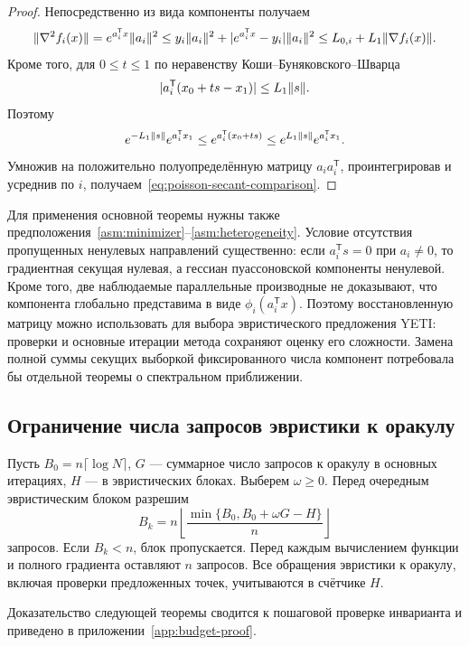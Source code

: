 \begin{proof}
Непосредственно из вида компоненты получаем
\[
 \lVert\nabla^2f_i(x)\rVert
 =e^{a_i^{\mathsf T}x}\lVert a_i\rVert^2
 \le y_i\lVert a_i\rVert^2+|e^{a_i^{\mathsf T}x}-y_i|\lVert a_i\rVert^2
 \le L_{0,i}+L_1\lVert\nabla f_i(x)\rVert.
\]
Кроме того, для $0\le t\le1$ по неравенству Коши--Буняковского--Шварца
\[
 |a_i^{\mathsf T}(x_0+ts-x_1)|\le L_1\lVert s\rVert.
\]
Поэтому
\[
 e^{-L_1\lVert s\rVert}e^{a_i^{\mathsf T}x_1}
 \le e^{a_i^{\mathsf T}(x_0+ts)}
 \le e^{L_1\lVert s\rVert}e^{a_i^{\mathsf T}x_1}.
\]
Умножив на положительно полуопределённую матрицу
$a_i a_i^{\mathsf T}$, проинтегрировав и усреднив по $i$,
получаем~\eqref{eq:poisson-secant-comparison}.
\end{proof}

Для применения основной теоремы нужны также
предположения~\ref{asm:minimizer}--\ref{asm:heterogeneity}.
Условие отсутствия пропущенных ненулевых направлений существенно:
если $a_i^{\mathsf T}s=0$ при $a_i\ne0$, то градиентная секущая нулевая,
а гессиан пуассоновской компоненты ненулевой.
Кроме того, две наблюдаемые параллельные производные не доказывают, что
компонента глобально представима в виде $\phi_i(a_i^{\mathsf T}x)$.
Поэтому восстановленную матрицу можно использовать для выбора
эвристического предложения YETI: проверки и основные итерации метода
сохраняют оценку его сложности.
Замена полной суммы секущих выборкой фиксированного числа компонент
потребовала бы отдельной теоремы о спектральном приближении.

\subsection{Ограничение числа запросов эвристики к оракулу}
\label{sec:budget}

Пусть $B_0=n\lceil\log N\rceil$, $G$ --- суммарное число запросов к оракулу
в основных итерациях, $H$ --- в эвристических блоках.
Выберем $\omega\ge0$. Перед очередным эвристическим блоком разрешим
\begin{equation}\label{eq:adaptive-cheap-budget}
 B_k=n\left\lfloor
       \frac{\min\{B_0,B_0+\omega G-H\}}n
       \right\rfloor
\end{equation}
запросов. Если $B_k<n$, блок пропускается. Перед каждым вычислением функции и полного градиента
оставляют $n$ запросов. Все обращения эвристики к оракулу, включая
проверки предложенных точек, учитываются в счётчике $H$.

Доказательство следующей теоремы сводится к пошаговой проверке инварианта
и приведено в приложении~\ref{app:budget-proof}.

